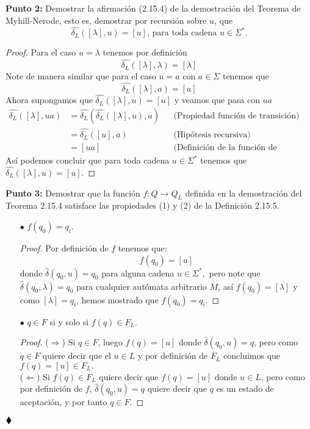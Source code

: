 \textbf{Punto 2: }Demostrar la afirmación (2.15.4) de la demostración del Teorema de Myhill-Nerode, esto es, demostrar por recursión sobre $u$, que
$$\widehat{\delta_L}([\lambda],u)=[u]\text{, para toda cadena }u\in\Sigma^*.$$
\begin{proof}
    Para el caso $u=\lambda$ tenemos por definición
    $$\widehat{\delta_L}([\lambda],\lambda)=[\lambda]$$
    Note de manera similar que para el caso $u=a$ con $a\in\Sigma$ tenemos que
    $$\widehat{\delta_L}([\lambda],a)=[a]$$
    Ahora supongamos que $\widehat{\delta_L}([\lambda],u)=[u]$ y veamos que pasa con $ua$
    \begin{align*}
       \widehat{\delta_L}([\lambda],ua)&=\widehat{\delta_L}(\widehat{\delta_L}([\lambda],u),a)&&\text{(Propiedad función de transición)}\\
       &=\widehat{\delta_L}([u],a)&&\text{(Hipótesis recursiva)} \\
       &=[ua]&&\text{(Definición de la función de transición).}
    \end{align*}
Así podemos concluir que para toda cadena $u\in\Sigma^*$ tenemos que $\widehat{\delta_L}([\lambda],u)=[u].$
\end{proof}
\textbf{Punto 3: }Demostrar que la función $f:Q\to Q_L$ definida en la demostración del Teorema 2.15.4 satisface las propiedades (1) y (2) de la Definición 2.15.5.
\begin{itemize}
    \item[$\bullet$]$f(q_0)=q_i.$
\begin{proof}
    Por definición de $f$ tenemos que:
    $$f(q_0)=[u]$$ 
    donde $\widehat{\delta}(q_0,u)=q_0$ para alguna cadena $u\in\Sigma^*,$ pero note que $\widehat{\delta}(q_0,\lambda)=q_0$ para cualquier autómata arbitrario $M$, así $f(q_0)=[\lambda]$ y como $[\lambda]=q_i$, hemos mostrado que $f(q_0)=q_i$. 
\end{proof}
    \item[$\bullet$]$q\in F$ si y solo si $f(q)\in F_L.$
    \begin{proof}
        ($\Rightarrow$) Si $q\in F$, luego $f(q)=[u]$ donde $\widehat{\delta}(q_0,u)=q$, pero como $q\in F$ quiere decir que el $u\in L$ y por definición de $F_L$ concluimos que $f(q)=[u]\in F_L.$\\
        ($\Leftarrow$) Si $f(q)\in F_L$ quiere decir que $f(q)=[u]$ donde $u\in L$, pero como por definición de $f$, $\widehat{\delta}(q_0,u)=q$ quiere decir que $q$ es un estado de aceptación, y por tanto $q\in F.$
    \end{proof}
\end{itemize}
$\hfill \blacklozenge$
